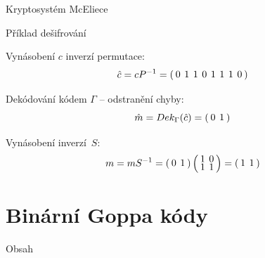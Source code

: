 \documentclass{beamer}
\begin{document}
\begin{frame}{Kryptosystém McEliece}

    \begin{exampleblock}{Příklad dešifrování}

        Vynásobení $c$ inverzí permutace:
        $$
        \arraycolsep=2pt
        \def\arraystretch{0.5}
            \hat{c} = c P^{-1} = \left(
                \begin{array}{*{8}{c}}
                    0 & 1 & 1 & 0 & 1 & 1 & 1 & 0 \\
                \end{array}
            \right)
        $$

        Dekódování kódem $\Gamma$ -- odstranění chyby:
        $$
        \arraycolsep=2pt
        \def\arraystretch{0.5}
            \hat{m} = Dek_{\Gamma}(\hat{c}) = \left(
                \begin{array}{*{2}{c}}
                    0 & 1 \\
                \end{array}
            \right)
        $$

        Vynásobení inverzí~$S$:
        $$
        \arraycolsep=2pt
        \def\arraystretch{0.5}
            m = m S^{-1} = \left(
                \begin{array}{*{2}{c}}
                    0 & 1 \\
                \end{array}
            \right) \left(
                \begin{array}{*{2}{c}}
                    1 & 0 \\
                    1 & 1 \\
                \end{array}
            \right) = \left(
                \begin{array}{*{2}{c}}
                    1 & 1 \\
                \end{array}
            \right)
        $$

    \end{exampleblock}

\end{frame}


\section{Binární Goppa kódy}
\begin{frame}{Obsah}
    \tableofcontents[currentsection]
\end{frame}
\end{document}
